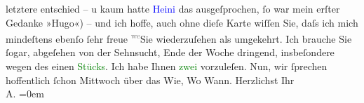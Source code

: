               letztere entschied – u kaum hatte \textcolor{blue}{Heini}{}\ledrightnote{\textcolor{blue}{Heinrich Schnitzler}} das
               ausgeſprochen, ſo war mein erſter Gedanke »Hugo«) – und ich hoffe, auch ohne dieſe
               Karte {\pb}wiſſen Sie, daſs ich mich mindeſtens ebenſo ſehr
               freue \substVorne{}\textsuperscript{\textcolor{gray}{we{\geminationn}}}\substDazwischen{}Sie\substHinten{} wiederzuſehen als umgekehrt. Ich brauche Sie ſogar, abgeſehen von der
               Sehnsucht, Ende der Woche dringend, insbeſondere wegen des einen \textcolor{green}{Stücks}{}. Ich habe Ihnen \textcolor{green}{zwei}{} vorzuleſen.\pend
           \pstart
           Nun, wir ſprechen hoffentlich ſchon Mittwoch über das Wie, Wo Wann.\pend
           \pstart
           Herzlichst Ihr{\\[\baselineskip]}\spacefill\mbox{A.}\pend
           \leftskip=0em{}\endnumbering{}  
      